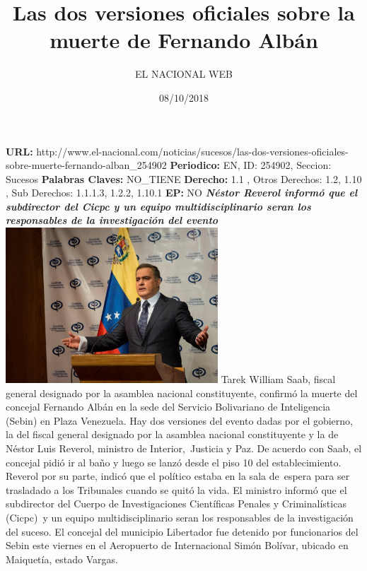 \documentclass{article}%
\title{\textbf{Las dos versiones oficiales sobre la muerte de Fernando Albán}}%
\author{EL NACIONAL WEB}%
\date{08/10/2018}%
\begin{document}
%
\normalsize%
\maketitle%
\textbf{URL: }%
http://www.el{-}nacional.com/noticias/sucesos/las{-}dos{-}versiones{-}oficiales{-}sobre{-}muerte{-}fernando{-}alban\_254902\newline%
%
\textbf{Periodico: }%
EN, %
ID: %
254902, %
Seccion: %
Sucesos\newline%
%
\textbf{Palabras Claves: }%
NO\_TIENE\newline%
%
\textbf{Derecho: }%
1.1%
, Otros Derechos: %
1.2, 1.10%
, Sub Derechos: %
1.1.1.3, 1.2.2, 1.10.1%
\newline%
%
\textbf{EP: }%
NO\newline%
\newline%
%
\textbf{\textit{Néstor Reverol informó que el subdirector del Cicpc y un equipo multidisciplinario seran los responsables de la investigación del evento~}}%
\newline%
\newline%
%
\includegraphics[width=300px]{228.jpg}%
\newline%
%
Tarek William Saab, fiscal general designado por la asamblea nacional constituyente, confirmó la muerte del concejal Fernando Albán en la sede del Servicio Bolivariano de Inteligencia (Sebin) en Plaza Venezuela.%
\newline%
%
Hay dos versiones del evento dadas por el gobierno, la del fiscal general designado por la asamblea nacional constituyente y la de Néstor Luis Reverol, ministro de Interior,~Justicia y Paz.%
\newline%
%
De acuerdo con Saab, el concejal pidió ir al baño y luego se lanzó desde el piso 10 del establecimiento. Reverol por su parte, indicó que el político estaba en la sala de~espera para ser trasladado a los Tribunales cuando se quitó la vida.%
\newline%
%
El ministro informó que el subdirector del Cuerpo de Investigaciones Científicas Penales y Criminalísticas (Cicpc)~y un equipo multidisciplinario seran los responsables de la investigación del suceso.%
\newline%
%
El concejal del municipio Libertador fue detenido por funcionarios del Sebin este viernes en el Aeropuerto de Internacional Simón Bolívar, ubicado en Maiquetía, estado Vargas.%
\newline%
%
\end{document}
